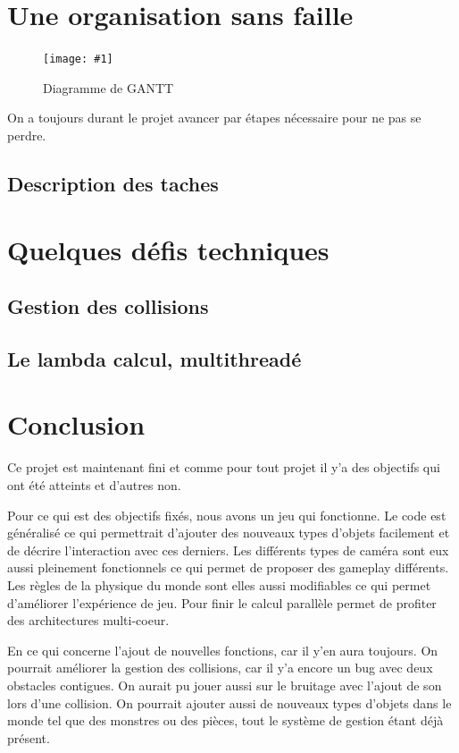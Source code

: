 \documentclass[french,12pt]{article}
\newcommand{\monimage}[4]{
\par\noindent
\begin{figure}[p] %
\begin{center}
\texttt{[image: \#1]} %
\caption{#2} %
\label{#3} %
\end{center}
\end{figure} %
}
\newcommand{\ml}[0]{\par\noindent}
\begin{document}
\section{Une organisation sans faille}

\monimage{gantt.pdf}{Diagramme de GANTT}{dg}{1}

On a toujours durant le projet avancer par étapes nécessaire pour ne pas se perdre.



\subsection{Description des taches}



\section{Quelques défis techniques}


\subsection{Gestion des collisions}


\subsection{Le lambda calcul, multithreadé}


\section{Conclusion}
Ce projet est maintenant fini et comme pour tout projet il y'a des objectifs qui ont été atteints et d'autres non.
\ml
Pour ce qui est des objectifs fixés, nous avons un jeu qui fonctionne. Le code est généralisé ce qui permettrait d'ajouter des nouveaux types d'objets facilement et de décrire l'interaction avec ces derniers. Les différents types de caméra sont eux aussi pleinement fonctionnels ce qui permet de proposer des gameplay différents. Les règles de la physique du monde sont elles aussi modifiables ce qui permet d'améliorer l'expérience de jeu. Pour finir le calcul parallèle permet de profiter des architectures multi-coeur. 
\ml
En ce qui concerne l'ajout de nouvelles fonctions, car il y'en aura toujours. On pourrait améliorer la gestion des collisions, car il y'a encore un bug avec deux obstacles contigues. On aurait pu jouer aussi sur le bruitage avec l'ajout de son lors d'une collision. On pourrait ajouter aussi de nouveaux types d'objets dans le monde tel que des monstres ou des pièces, tout le système de gestion étant déjà présent.

\newpage
\listoffigures
\newpage
\end{document}
